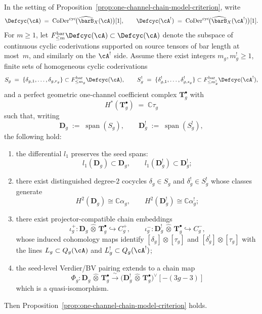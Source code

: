 \begin{proposition}\label{prop:one-channel-seed-criterion}
In the setting of
Proposition~\textup{\ref{prop:one-channel-chain-model-criterion}},
write
\[
\Defcyc(\cA)
\;=\;
\operatorname{CoDer}^{\mathrm{cyc}}
\!\bigl(\widehat{\barB}_X(\cA)\bigr)[1],
\qquad
\Defcyc(\cA^!)
\;=\;
\operatorname{CoDer}^{\mathrm{cyc}}
\!\bigl(\widehat{\barB}_X(\cA^!)\bigr)[1].
\]
For $m \geq 1$, let
$F_{\leq m}^{\mathrm{bar}}\Defcyc(\cA) \subset \Defcyc(\cA)$ denote
the subspace of continuous cyclic coderivations supported on source
tensors of bar length at most~$m$, and similarly on the $\cA^!$ side.
Assume there exist integers $m_g,m_g^! \geq 1$, finite sets of
homogeneous cyclic coderivations
\[
S_g
\;=\;
\{\delta_{g,1},\ldots,\delta_{g,r_g}\}
\subset F_{\leq m_g}^{\mathrm{bar}}\Defcyc(\cA),
\qquad
S_g^!
\;=\;
\{\delta_{g,1}^!,\ldots,\delta_{g,s_g}^!\}
\subset F_{\leq m_g^!}^{\mathrm{bar}}\Defcyc(\cA^!),
\]
and a perfect geometric one-channel coefficient complex
$\mathbf{T}_g^\bullet$ with
\[
H^*(\mathbf{T}_g^\bullet) \;=\; \mathbb{C}\tau_g
\]
such that, writing
\[
\mathbf{D}_g \;:=\; \operatorname{span}(S_g),
\qquad
\mathbf{D}_g^! \;:=\; \operatorname{span}(S_g^!),
\]
the following hold:
\begin{enumerate}[label=\textup{(\roman*)}]
\item the differential $l_1$ preserves the seed spans:
  \[
  l_1(\mathbf{D}_g)\subset \mathbf{D}_g,
  \qquad
  l_1(\mathbf{D}_g^!)\subset \mathbf{D}_g^!;
  \]
\item there exist distinguished degree-$2$ cocycles
  $\delta_g \in S_g$ and $\delta_g^! \in S_g^!$ whose classes generate
  \[
  H^2(\mathbf{D}_g)\cong \mathbb{C}\alpha_g,
  \qquad
  H^2(\mathbf{D}_g^!)\cong \mathbb{C}\alpha_g^!;
  \]
\item there exist projector-compatible chain embeddings
  \[
  \iota_g^+ \colon
  \mathbf{D}_g \,\widehat{\otimes}\, \mathbf{T}_g^\bullet
  \hookrightarrow C_g^+,
  \qquad
  \iota_g^- \colon
  \mathbf{D}_g^! \,\widehat{\otimes}\, \mathbf{T}_g^\bullet
  \hookrightarrow C_g^-,
  \]
  whose induced cohomology maps identify
  $[\delta_g]\otimes[\tau_g]$ and
  $[\delta_g^!]\otimes[\tau_g]$ with the lines
  $L_g \subset Q_g(\cA)$ and
  $L_g^! \subset Q_g(\cA^!)$;
\item the seed-level Verdier/BV pairing extends to a chain map
  \[
  \Phi_g \colon
  \mathbf{D}_g \,\widehat{\otimes}\, \mathbf{T}_g^\bullet
  \xrightarrow{\;\sim\;}
  \bigl(
    \mathbf{D}_g^! \,\widehat{\otimes}\, \mathbf{T}_g^\bullet
  \bigr)^\vee[-(3g{-}3)]
  \]
  which is a quasi-isomorphism.
\end{enumerate}
Then Proposition~\ref{prop:one-channel-chain-model-criterion} holds.


\end{proposition}
